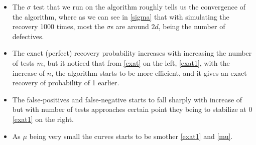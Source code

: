 \begin{itemize}
	\item The $ \sigma $ test that we run on the algorithm roughly tells us the convergence of the algorithm, where as we can see in  \ref{sigma} that with simulating the recovery 1000 times, most the $ \sigma $s are around $ 2d $, being the number of defectives. 
	
	\item The exact (perfect) recovery probability increases with increasing the number of tests $ m $,  but it noticed that from \ref{exat} on the left, \ref{exat1}, with the increase of $ n $, the algorithm starts to be more efficient, and it gives an exact recovery of probability of 1 earlier.    
	\item The false-positives and false-negative starts to fall sharply with increase of but with number of tests approaches certain point they being to stabilize at 0 \ref{exat1} on the right. 
	
	\item As $ \mu $ being very small the curves starts to be smother \ref{exat1} and \ref{mu}.    
\end{itemize}
 